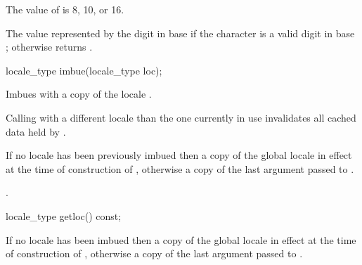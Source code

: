 \begin{itemdescr}
\pnum
\expects
The value of  is 8, 10, or 16.

\pnum
\returns
The value represented by the digit  in base
 if the character  is a valid digit in base
; otherwise returns .
\end{itemdescr}

%
\begin{indexed}{}
\begin{itemdecl}
locale_type imbue(locale_type loc);
\end{itemdecl}
\end{indexed}

\begin{itemdescr}
\pnum
\effects
Imbues  with a copy of the
locale .
\begin{note}
Calling  with a
different locale than the one currently in use invalidates all cached
data held by .
\end{note}

\pnum
\returns
If no locale has been previously imbued then a copy of the
global locale in effect at the time of construction of ,
otherwise a copy of the last argument passed to .

\pnum
\ensures
{}.
\end{itemdescr}

%
\begin{indexed}{}
\begin{itemdecl}
locale_type getloc() const;
\end{itemdecl}
\end{indexed}

\begin{itemdescr}
\pnum
\returns
If no locale has been imbued then a copy of the global locale
in effect at the time of construction of , otherwise a copy of
the last argument passed to .
\end{itemdescr}

